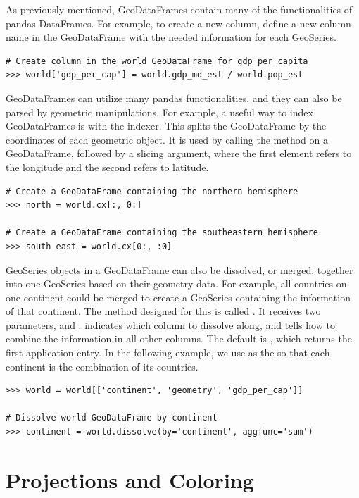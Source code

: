 As previously mentioned, GeoDataFrames contain many of the functionalities of pandas DataFrames.
For example, to create a new column, define a new column name in the GeoDataFrame with the needed information for each GeoSeries.

\begin{lstlisting}
# Create column in the world GeoDataFrame for gdp_per_capita
>>> world['gdp_per_cap'] = world.gdp_md_est / world.pop_est
\end{lstlisting}

GeoDataFrames can utilize many pandas functionalities, and they can also be parsed by geometric manipulations.
For example, a useful way to index GeoDataFrames is with the  indexer.
This splits the GeoDataFrame by the coordinates of each geometric object.
It is used by calling the method  on a GeoDataFrame, followed by a slicing argument, where the first element refers to the longitude and the second refers to latitude.

\begin{lstlisting}
# Create a GeoDataFrame containing the northern hemisphere
>>> north = world.cx[:, 0:]

# Create a GeoDataFrame containing the southeastern hemisphere
>>> south_east = world.cx[0:, :0]
\end{lstlisting}

GeoSeries objects in a GeoDataFrame can also be dissolved, or merged, together into one GeoSeries based on their geometry data.
For example, all countries on one continent could be merged to create a GeoSeries containing the information of that continent.
The method designed for this is called .
It receives two parameters,  and .
 indicates which column to dissolve along, and  tells how to combine the information in all other columns.
The default  is , which returns the first application entry.
In the following example, we use  as the  so that each continent is the combination of its countries.

\begin{lstlisting}
>>> world = world[['continent', 'geometry', 'gdp_per_cap']]

# Dissolve world GeoDataFrame by continent
>>> continent = world.dissolve(by='continent', aggfunc='sum')
\end{lstlisting}


\section*{Projections and Coloring} %

